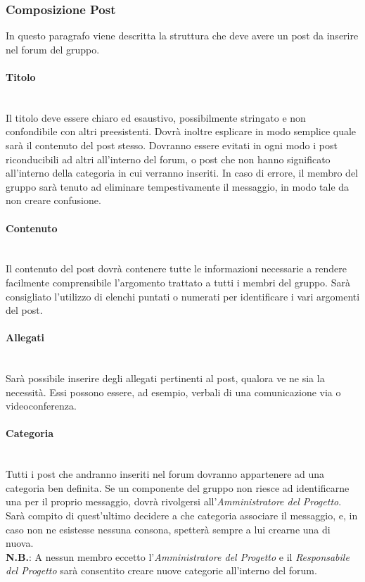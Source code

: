 \subsubsection{Composizione Post}
In questo paragrafo viene descritta la struttura che deve avere un post da inserire nel forum del gruppo.

\paragraph{Titolo}\mbox{}\\
Il titolo deve essere chiaro ed esaustivo, possibilmente stringato e non confondibile con altri preesistenti. Dovrà inoltre esplicare in modo semplice quale sarà il contenuto del post stesso. Dovranno essere evitati in ogni modo i post riconducibili ad altri all'interno del forum, o post che non hanno significato all'interno della categoria in cui verranno inseriti. In caso di errore, il membro del gruppo sarà tenuto ad eliminare tempestivamente il messaggio, in modo tale da non creare confusione.

\paragraph{Contenuto}\mbox{}\\
Il contenuto del post dovrà contenere tutte le informazioni necessarie a rendere facilmente comprensibile l'argomento trattato a tutti i membri del gruppo.
Sarà consigliato l'utilizzo di elenchi puntati o numerati per identificare i vari argomenti del post.

\paragraph{Allegati}\mbox{}\\
Sarà possibile inserire degli allegati pertinenti al post, qualora ve ne sia la necessità. Essi possono essere, ad esempio, verbali di una comunicazione via  o videoconferenza.

\paragraph{Categoria}\mbox{}\\
Tutti i post che andranno inseriti nel forum dovranno appartenere ad una categoria ben definita. Se un componente del gruppo non riesce ad identificarne una per il proprio messaggio, dovrà rivolgersi all'\textit{Amministratore del Progetto}. Sarà compito di quest'ultimo decidere a che categoria associare il messaggio, e, in caso non ne esistesse nessuna consona, spetterà sempre a lui crearne una di nuova. \\ 
\textbf{N.B.}: A nessun membro eccetto l'\textit{Amministratore del Progetto} e il \textit{Responsabile del Progetto} sarà consentito creare nuove categorie all'interno del forum.

